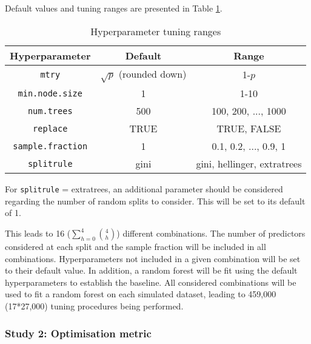 \documentclass{article}
\begin{document}
Default values and tuning ranges are presented in Table \ref{tab:hyp_ranges}.

\begin{table}[]
    \centering
    \caption{Hyperparameter tuning ranges}
    \begin{tabular}{|c|c|c|}
         \hline \rowcolor{orange!50}
         Hyperparameter & Default & Range\\
         \hline
         \texttt{mtry} & $\sqrt{p}$ (rounded down) & 1-$p$\\
         \texttt{min.node.size} & 1 & 1-10\\ %
         \hline
         \texttt{num.trees} & 500 & 100, 200, ..., 1000\\
         \texttt{replace} & TRUE & TRUE, FALSE\\
         \texttt{sample.fraction} & 1 & 0.1, 0.2, ..., 0.9, 1\\
         \texttt{splitrule} & gini & gini, hellinger, extratrees\\
         \hline
    \end{tabular}
    \begin{tablenotes}
      \small
      \item For \texttt{splitrule} = extratrees, an additional parameter should be considered regarding the number of random splits to consider. This will be set to its default of 1.
    \end{tablenotes}
    \label{tab:hyp_ranges}
\end{table}

This leads to 16 ($\sum_{h=0}^4\binom{4}{h}$) different combinations. The number of predictors considered at each split and the sample fraction will be included in all combinations. Hyperparameters not included in a given combination will be set to their default value. In addition, a random forest will be fit using the default hyperparameters to establish the baseline. All considered combinations will be used to fit a random forest on each simulated dataset, leading to 459,000 (17*27,000) tuning procedures being performed.

\subsubsection{Study 2: Optimisation metric}
\end{document}

